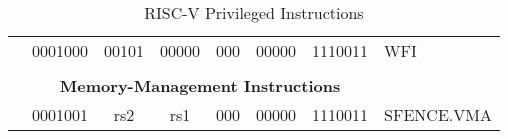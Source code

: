\begin{table}[p]
\begin{small}
\begin{center}
\begin{tabular}{p{0in}p{0.4in}p{0.05in}p{0.05in}p{0.05in}p{0.05in}p{0.4in}p{0.6in}p{0.4in}p{0.6in}p{0.7in}l}
&
\multicolumn{4}{|c|}{0001000} &
\multicolumn{2}{c|}{00101} &
\multicolumn{1}{c|}{00000} &
\multicolumn{1}{c|}{000} &
\multicolumn{1}{c|}{00000} &
\multicolumn{1}{c|}{1110011} & WFI \\
\cline{2-11}
  

&
\multicolumn{10}{c}{} & \\
&
\multicolumn{10}{c}{\bf Memory-Management Instructions} & \\
\cline{2-11}
  

&
\multicolumn{4}{|c|}{0001001} &
\multicolumn{2}{c|}{rs2} &
\multicolumn{1}{c|}{rs1} &
\multicolumn{1}{c|}{000} &
\multicolumn{1}{c|}{00000} &
\multicolumn{1}{c|}{1110011} & SFENCE.VMA \\
\cline{2-11}
  

\end{tabular}
\end{center}
\end{small}
\caption{RISC-V Privileged Instructions}
\label{priv-instr-table}
\end{table}
  
